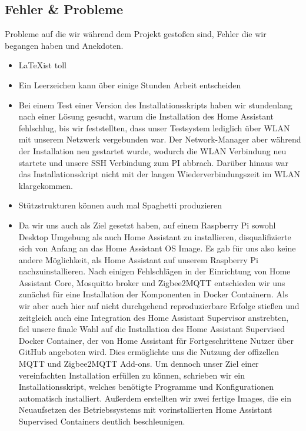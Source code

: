 \subsection{Fehler \& Probleme}\label{fz_fehler}
Probleme auf die wir während dem Projekt gestoßen sind, Fehler die wir begangen haben und Anekdoten.
\begin{itemize}
    \item \LaTeX   ist toll
    \item Ein Leerzeichen kann über einige Stunden Arbeit entscheiden
    \item Bei einem Test einer Version des Installationsskripts haben wir stundenlang nach einer Lösung gesucht, warum die Installation des Home Assistant fehlschlug, bis wir feststellten, dass unser Testsystem lediglich über WLAN mit unserem Netzwerk vergebunden war. 
    Der Network-Manager aber während der Installation neu gestartet wurde, wodurch die WLAN Verbindung neu startete und unsere SSH Verbindung zum PI abbrach. Darüber hinaus war das Installationsskript nicht mit der langen Wiederverbindungszeit im WLAN klargekommen.
    \item Stützstrukturen können auch mal Spaghetti produzieren
    \item Da wir uns auch als Ziel gesetzt haben, auf einem Raspberry Pi sowohl Desktop Umgebung als auch Home Assistant zu installieren, disqualifizierte sich von Anfang an das Home Assistant OS Image. Es gab für uns also keine andere Möglichkeit, als Home Assistant auf unserem Raspberry Pi nachzuinstallieren. 
    Nach einigen Fehlschlägen in der Einrichtung von Home Assistant Core, Mosquitto broker und Zigbee2MQTT entschieden wir uns zunächst für eine Installation der Komponenten in Docker Containern. 
    Als wir aber auch hier auf nicht durchgehend reproduzierbare Erfolge stießen und zeitgleich auch eine Integration des Home Assistant Supervisor anstrebten, fiel unsere finale Wahl auf die Installation des Home Assistant Supervised Docker Container, der von Home Assistant für Fortgeschrittene Nutzer über GitHub angeboten wird. 
    Dies ermöglichte uns die Nutzung der offizellen MQTT und Zigbee2MQTT Add-ons. 
    Um dennoch unser Ziel einer vereinfachten Installation erfüllen zu können, schrieben wir ein Installationsskript, welches benötigte Programme und Konfigurationen automatisch installiert.
    Außerdem erstellten wir zwei fertige Images, die ein Neuaufsetzen des Betriebssystems mit vorinstallierten Home Assistant Supervised Containers deutlich beschleunigen.  
\end{itemize}